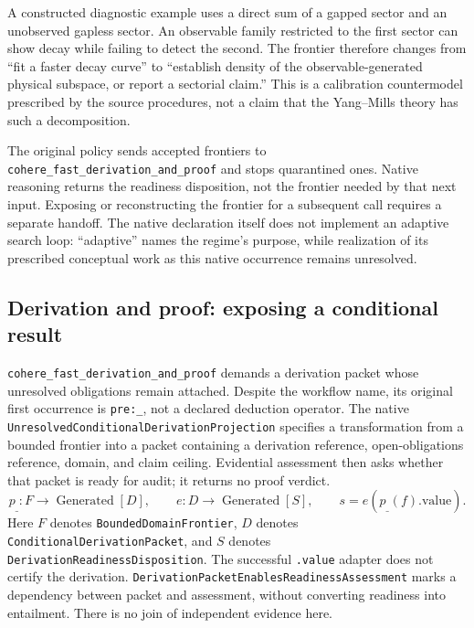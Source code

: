 A constructed diagnostic example uses a direct sum of a gapped sector and an unobserved gapless sector. An observable family restricted to the first sector can show decay while failing to detect the second. The frontier therefore changes from ``fit a faster decay curve'' to ``establish density of the observable-generated physical subspace, or report a sectorial claim.'' This is a calibration countermodel prescribed by the source procedures, not a claim that the Yang--Mills theory has such a decomposition.

The original policy sends accepted frontiers to \texttt{cohere\_fast\_derivation\_and\_proof} and stops quarantined ones. Native reasoning returns the readiness disposition, not the frontier needed by that next input. Exposing or reconstructing the frontier for a subsequent call requires a separate handoff. The native declaration itself does not implement an adaptive search loop: ``adaptive'' names the regime's purpose, while realization of its prescribed conceptual work as this native occurrence remains unresolved.



\subsection{Derivation and proof: exposing a conditional result}
\label{app:granular-cohere_fast_derivation_and_proof}
\texttt{cohere\_fast\_derivation\_and\_proof} demands a derivation packet whose unresolved obligations remain attached. Despite the workflow name, its original first occurrence is \texttt{pre:\_}, not a declared deduction operator. The native \texttt{Unresolved\allowbreak Conditional\allowbreak Derivation\allowbreak Projection} specifies a transformation from a bounded frontier into a packet containing a derivation reference, open-obligations reference, domain, and claim ceiling. Evidential assessment then asks whether that packet is ready for audit; it returns no proof verdict.
\[
 p_{\_}:F\to\operatorname{Generated}[D],\qquad
 e:D\to\operatorname{Generated}[S],\qquad s=e(p_{\_}(f).\mathrm{value}).
\]
Here $F$ denotes \texttt{Bounded\allowbreak Domain\allowbreak Frontier}, $D$ denotes \texttt{Conditional\allowbreak Derivation\allowbreak Packet}, and $S$ denotes \texttt{Derivation\allowbreak Readiness\allowbreak Disposition}. The successful \texttt{.value} adapter does not certify the derivation. \texttt{Derivation\allowbreak Packet\allowbreak Enables\allowbreak Readiness\allowbreak Assessment} marks a dependency between packet and assessment, without converting readiness into entailment. There is no join of independent evidence here.

